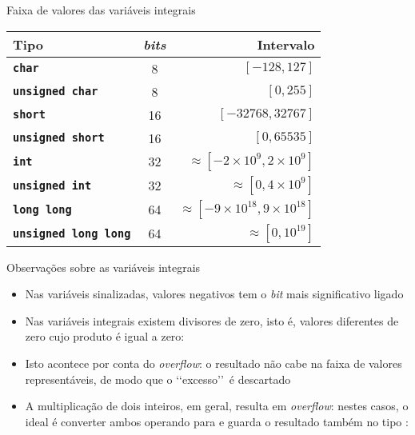 \begin{frame}[fragile]{Faixa de valores das variáveis integrais}

    \begin{table}[!ht]
        \centering

        \begin{tabular}{lcr}
            \toprule
            \textbf{Tipo} & \textit{bits} & \textbf{Intervalo} \\
            \midrule
            \texttt{\textbf{char}} & 8 & $[-128, 127]$ \\
            \rowcolor[gray]{0.9}
            \texttt{\textbf{unsigned char}} & 8 & $[0, 255]$ \\
            \texttt{\textbf{short}} & 16 & $[-32768, 32767]$ \\
            \rowcolor[gray]{0.9}
            \texttt{\textbf{unsigned short}} & 16 & $[0, 65535]$ \\
            \texttt{\textbf{int}} & 32 & $\approx [-2\times 10^9, 2\times 10^9]$ \\
            \rowcolor[gray]{0.9}
            \texttt{\textbf{unsigned int}} & 32 & $\approx [0, 4\times 10^9]$ \\
            \texttt{\textbf{long long}} & 64 & $\approx [-9\times 10^{18}, 9\times 10^{18}]$ \\
            \rowcolor[gray]{0.9}
            \texttt{\textbf{unsigned long long}} & 64 & $\approx [0, 10^{19}]$ \\
            \bottomrule
        \end{tabular}
    \end{table}

\end{frame}

\begin{frame}[fragile]{Observações sobre as variáveis integrais}

    \begin{itemize}
        \item Nas variáveis sinalizadas, valores negativos tem o \textit{bit} mais significativo
            ligado

        \item Nas variáveis integrais existem divisores de zero, isto é, valores diferentes de
            zero cujo produto é igual a zero:

        \item Isto acontece por conta do \textit{overflow}: o resultado não cabe na faixa de
            valores representáveis, de modo que o \lq\lq excesso\rq\rq\ é descartado

        \item A multiplicação de dois inteiros, em geral, resulta em \textit{overflow}: nestes
            casos, o ideal é converter ambos operando para  e guarda o
            resultado também no tipo :
    \end{itemize}

\end{frame}


